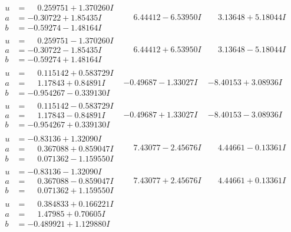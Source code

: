 \documentclass[1p]{elsarticle_modified}
\theoremstyle{definition}
\begin{document}
$$\begin{array}{c|c|c}
\begin{aligned}
u &= \phantom{-}0.259751 + 1.370260 I \\
a &= -0.30722 + 1.85435 I \\
b &= -0.59274 - 1.48164 I\end{aligned}
 & \phantom{-}6.44412 - 6.53950 I & \phantom{-}3.13648 + 5.18044 I \\ \hline\begin{aligned}
u &= \phantom{-}0.259751 - 1.370260 I \\
a &= -0.30722 - 1.85435 I \\
b &= -0.59274 + 1.48164 I\end{aligned}
 & \phantom{-}6.44412 + 6.53950 I & \phantom{-}3.13648 - 5.18044 I \\ \hline\begin{aligned}
u &= \phantom{-}0.115142 + 0.583729 I \\
a &= \phantom{-}1.17843 + 0.84891 I \\
b &= -0.954267 - 0.339130 I\end{aligned}
 & -0.49687 - 1.33027 I & -8.40153 + 3.08936 I \\ \hline\begin{aligned}
u &= \phantom{-}0.115142 - 0.583729 I \\
a &= \phantom{-}1.17843 - 0.84891 I \\
b &= -0.954267 + 0.339130 I\end{aligned}
 & -0.49687 + 1.33027 I & -8.40153 - 3.08936 I \\ \hline\begin{aligned}
u &= -0.83136 + 1.32090 I \\
a &= \phantom{-}0.367088 + 0.859047 I \\
b &= \phantom{-}0.071362 - 1.159550 I\end{aligned}
 & \phantom{-}7.43077 - 2.45676 I & \phantom{-}4.44661 - 0.13361 I \\ \hline\begin{aligned}
u &= -0.83136 - 1.32090 I \\
a &= \phantom{-}0.367088 - 0.859047 I \\
b &= \phantom{-}0.071362 + 1.159550 I\end{aligned}
 & \phantom{-}7.43077 + 2.45676 I & \phantom{-}4.44661 + 0.13361 I \\ \hline\begin{aligned}
u &= \phantom{-}0.384833 + 0.166221 I \\
a &= \phantom{-}1.47985 + 0.70605 I \\
b &= -0.489921 + 1.129880 I\end{aligned}

\end{array}$$
\end{document}
